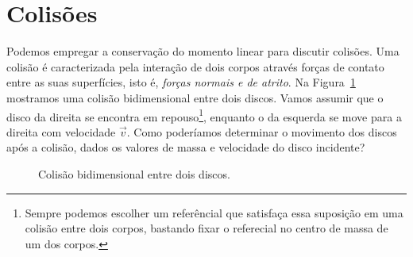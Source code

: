 

\section{Colisões}

Podemos empregar a conservação do momento linear para discutir colisões. Uma colisão é caracterizada pela interação de dois corpos através forças de contato entre as suas superfícies, isto é, \emph{forças normais e de atrito}. Na Figura~\ref{Fig:ColisaoEntreDoisDiscos} mostramos uma colisão bidimensional entre dois discos. Vamos assumir que o disco da direita se encontra em repouso\footnote{Sempre podemos escolher um referêncial que satisfaça essa suposição em uma colisão entre dois corpos, bastando fixar o referecial no centro de massa de um dos corpos.}, enquanto o da esquerda se move para a direita com velocidade $\vec{v}$. Como poderíamos determinar o movimento dos discos após a colisão, dados os valores de massa e velocidade do disco incidente?

\begin{figure}[!htb]
\centering
{}
\caption{Colisão bidimensional entre dois discos. \label{Fig:ColisaoEntreDoisDiscos}}
\end{figure}

